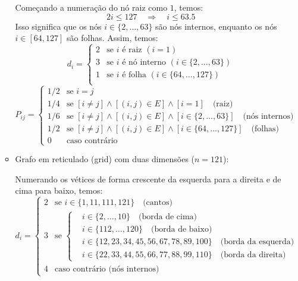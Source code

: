 \begin{enumerate}
\begin{resposta}
\begin{itemize}
            Começando a numeração do nó raiz como $1$, temos:
            $$ 2 i \leq 127 \quad \Rightarrow \quad i \leq 63.5 $$
            Isso significa que os nós $i \in \{2,\dots,63\}$ são nós internos, enquanto os nós $i \in [64, 127]$ são folhas. Assim, temos:
            $$d_i = \begin{cases}         
                2 & \text{se } i \text{ é raiz }  (i=1)\\
                3 & \text{se } i \text{ é nó interno } (i \in \{2,\dots,63\}) \\
                1 & \text{se } i \text{ é folha } (i \in \{64,\dots,127\}) \\
            \end{cases}$$
            $$
            P_{ij} = \begin{cases}
                1/2 & \text{se } i = j \\
                1/4 & \text{se } [i \neq j] \land [(i,j) \in E] \land [i=1] \quad \text{(raiz)} \\
                1/6 & \text{se } [i \neq j] \land [(i,j) \in E] \land [i \in \{2,\dots,63\}] \quad \text{(nós internos)} \\
                1/2 & \text{se } [i \neq j] \land [(i,j) \in E] \land [i \in \{64,\dots,127\}] \quad \text{(folhas)} \\
                0 & \text{caso contrário}
            \end{cases}
            $$

            \item Grafo em reticulado (grid) com duas dimensões ($n = 121$):
            
            Numerando os vétices de forma crescente da esquerda para a direita e de cima para baixo, temos:
            $$d_i = \begin{cases}         
                2 & \text{se } i \in \{1, 11, 111, 121\} \quad \text{(cantos)} \\
                3 & \text{se } 
                    \begin{cases}
                        & i \in \{2,\dots,10\} \quad \text{(borda de cima)} \\
                        & i \in \{112,\dots,120\} \quad \text{(borda de baixo)} \\
                        & i \in \{12, 23, 34, 45, 56, 67, 78, 89, 100\} \quad \text{(borda da esquerda)} \\
                        & i \in \{22, 33, 44, 55, 66, 77, 88, 99, 110\} \quad \text{(borda da direita)}
                    \end{cases} \\
                4 & \text{caso contrário (nós internos)}
            \end{cases}
            $$


\end{itemize}
\end{resposta}
\end{enumerate}
